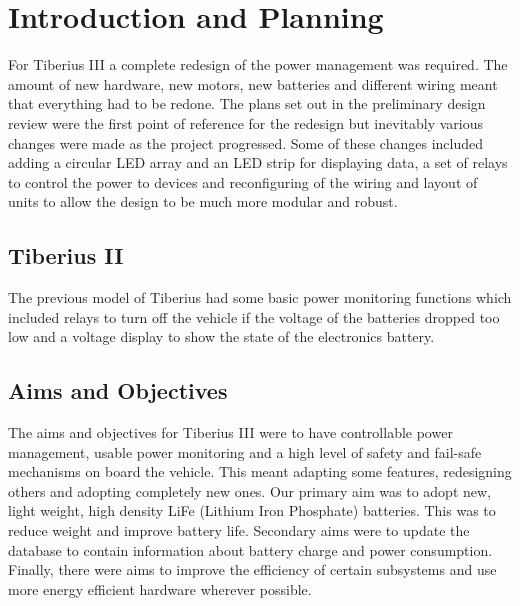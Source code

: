 \section{Introduction and Planning}

For Tiberius III a complete redesign of the power management was required. The amount of new hardware, new motors, new batteries and different wiring meant that everything had to be redone. The plans set out in the preliminary design review were the first point of reference for the redesign but inevitably various changes were made as the project progressed.
Some of these changes included adding a circular LED array and an LED strip for displaying data, a set of relays to control the power to devices and reconfiguring of the wiring and layout of units to allow the design to be much more modular and robust.

\subsection{Tiberius II}
The previous model of Tiberius had some basic power monitoring functions which included relays to turn off the vehicle if the voltage of the batteries dropped too low and a voltage display to show the state of the electronics battery.

\subsection{Aims and Objectives}
The aims and objectives for Tiberius III were to have controllable power management, usable power monitoring and a high level of safety and fail-safe mechanisms on board the vehicle.  
This meant adapting some features, redesigning others and adopting completely new ones. Our primary aim was to adopt new, light weight, high density LiFe (Lithium Iron Phosphate) batteries. This was to reduce weight and improve battery life. Secondary aims were to update the database to contain information about battery charge  and power consumption.  Finally, there were aims to improve the efficiency of certain subsystems and use more energy efficient hardware wherever possible.
